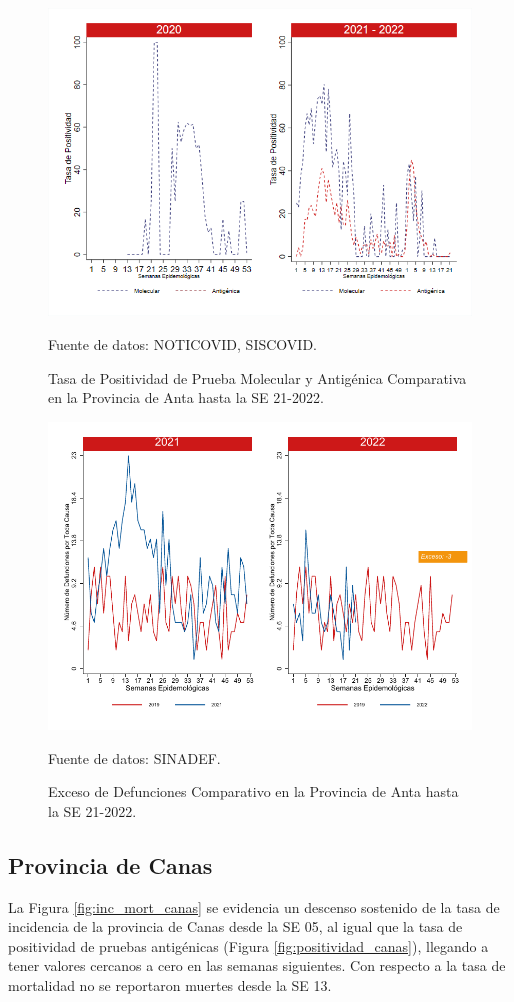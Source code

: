 \documentclass[12pt,a4paper,openany]{book}
\begin{document}
	\begin{figure}[h]
		\caption{Tasa de Positividad de Prueba Molecular y Antigénica Comparativa en la Provincia de Anta hasta la SE 21-2022.}\label{fig:positividad_anta}
		\begin{center}
			\includegraphics[width=0.7\linewidth]{../figuras/positividad_20_21_2.png}
		\end{center}
		{\footnotesize {Fuente de datos: NOTICOVID, SISCOVID.}}
	\end{figure}
	
	\begin{figure}[h]
		\caption{Exceso de Defunciones Comparativo en la Provincia de Anta hasta la SE 21-2022.}\label{fig:exceso_anta}
		\begin{center}
			\includegraphics[width=0.7\linewidth]{../figuras/exceso_2.pdf}
		\end{center}
		{\footnotesize {Fuente de datos: SINADEF.}}
	\end{figure}
	
	\clearpage
	
	\subsection*{Provincia de Canas}
	\noindent La Figura \ref{fig:inc_mort_canas} se evidencia un descenso sostenido de la tasa de incidencia de la provincia de Canas desde la SE 05, al igual que la tasa de positividad de pruebas antigénicas (Figura \ref{fig:positividad_canas}),  llegando a tener valores cercanos a cero en las semanas siguientes. Con respecto a la tasa de mortalidad no se reportaron muertes desde la SE 13. 
	
\end{document}
